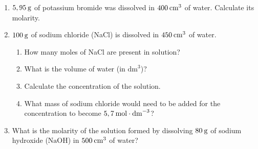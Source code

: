       \label{m38712*id283713}\begin{enumerate}[noitemsep, label=\textbf{\arabic*}. ] 
            \label{m38712*uid92}\item \begin{math}5,95\phantom{\rule{2pt}{0ex}}\mathrm{g}\end{math} of potassium bromide was dissolved in \begin{math}400\phantom{\rule{2pt}{0ex}}{\mathrm{cm}}^{3}\end{math} of water. Calculate its molarity.\newline
            
\label{m38712*uid93}\item \begin{math}100\phantom{\rule{2pt}{0ex}}\mathrm{g}\end{math} of sodium chloride (NaCl) is dissolved in \begin{math}450\phantom{\rule{2pt}{0ex}}{\mathrm{cm}}^{3}\end{math} of water.
\label{m38712*id283768}\begin{enumerate}[noitemsep, label=\textbf{\alph*}. ] 
            \label{m38712*uid94}\item How many moles of NaCl are present in solution?
\label{m38712*uid95}\item What is the volume of water (in \begin{math}{\mathrm{dm}}^{3}\end{math})?
\label{m38712*uid96}\item Calculate the concentration of the solution.
\label{m38712*uid97}\item What mass of sodium chloride would need to be added for the concentration to become \begin{math}5,7\phantom{\rule{2pt}{0ex}}\mathrm{mol}\ensuremath{\cdot}{\mathrm{dm}}^{-3}\end{math}?
\end{enumerate}
                \label{m38712*uid98}\item What is the molarity of the solution formed by dissolving \begin{math}80\phantom{\rule{2pt}{0ex}}\mathrm{g}\end{math} of sodium hydroxide (\begin{math}\mathrm{NaOH}\end{math}) in \begin{math}500\phantom{\rule{2pt}{0ex}}{\mathrm{cm}}^{3}\end{math} of water?\newline
            

\end{enumerate}
